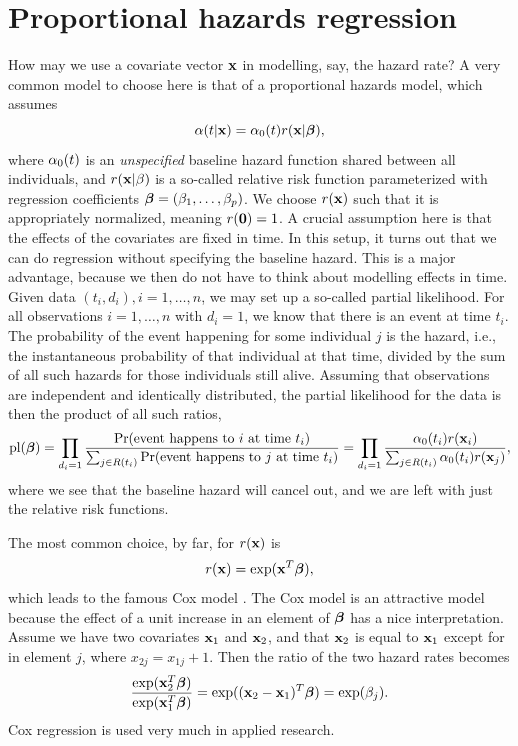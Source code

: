 \section{Proportional hazards regression}
How may we use a covariate vector $\mathbf{x}$ in modelling, say, the hazard rate? A very common model to choose here is that of a proportional hazards model, which assumes
\begin{equation}\label{PH}
    \alpha(t|\mathbf{x})=\alpha_0(t)r(\mathbf{x}|\boldsymbol{\beta}),
\end{equation}
where $\alpha_0(t)$ is an \textit{unspecified} baseline hazard function shared between all individuals, and $r(\mathbf{x}|\beta)$ is a so-called relative risk function parameterized with regression coefficients $\boldsymbol{\beta}=(\beta_1,\ldots,\beta_p)$. We choose $r(\mathbf{x})$ such that it is appropriately normalized, meaning $r(\mathbf{0})=1$. A crucial assumption here is that the effects of the covariates are fixed in time. In this setup, it turns out that we can do regression without specifying the baseline hazard. This is a major advantage, because we then do not have to think about modelling effects in time. Given data $(t_i,d_i),i=1,\ldots,n$, we may set up a so-called partial likelihood.  For all observations $i=1,\ldots,n$ with $d_i=1$, we know that there is an event at time $t_i$. The probability of the event happening for some individual $j$ is the hazard, i.e., the instantaneous probability of that individual at that time, divided by the sum of all such hazards for those individuals still alive. Assuming that observations are independent and identically distributed, the partial likelihood for the data is then the product of all such ratios,
\begin{equation*}
    \operatorname{pl}(\boldsymbol{\beta})=\prod_{d_i=1}\frac{\Pr(\text{event happens to }i\text{ at time }t_i)}{\sum_{j\in R(t_i)}\Pr(\text{event happens to }j\text{ at time }t_i)}=\prod_{d_i=1}\frac{\alpha_0(t_i)r(\mathbf{x}_i)}{\sum_{j\in R(t_i)} \alpha_0(t_i)r(\mathbf{x}_j)},
\end{equation*}
where we see that the baseline hazard will cancel out, and we are left with just the relative risk functions.

The most common choice, by far, for $r(\mathbf{x})$ is
\begin{equation*}
    r(\mathbf{x})=\exp(\mathbf{x}^T\boldsymbol{\beta}),
\end{equation*}
which leads to the famous Cox model \citep{cox}. The Cox model is an attractive model because the effect of a unit increase in an element of $\boldsymbol{\beta}$ has a nice interpretation. Assume we have two covariates $\mathbf{x}_1$ and $\mathbf{x}_2$, and that $\mathbf{x}_2$ is equal to $\mathbf{x}_1$ except for in element $j$, where $x_{2j}=x_{1j}+1$. Then the ratio of the two hazard rates becomes
\begin{equation*}
    \frac{\exp(\mathbf{x}_2^T\boldsymbol{\beta})}{\exp(\mathbf{x}_1^T\boldsymbol{\beta})}=\exp((\mathbf{x}_2-\mathbf{x}_1)^T\boldsymbol{\beta})=\exp(\beta_j).
\end{equation*}
Cox regression is used very much in applied research.

